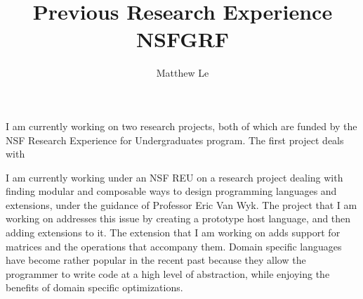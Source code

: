 \documentclass[a4paper,12pt]{article}
\title{Previous Research Experience NSFGRF \vspace{-1ex}}
\author{Matthew Le\vspace{-5ex}}
\begin{document}
\maketitle

I am currently working on two research projects, both of which are funded by the NSF Research Experience for Undergraduates program.  The first project deals with 

I am currently working under an NSF REU on a research project dealing with finding modular and composable ways to design programming languages and extensions, under the guidance of Professor Eric Van Wyk.  The project that I am working on addresses this issue by creating a prototype host language, and then adding extensions to it.  The extension that I am working on adds support for matrices and the operations that accompany them.  Domain specific languages have become rather popular in the recent past because they allow the programmer to write code at a high level of abstraction, while enjoying the benefits of domain specific optimizations. 
\end{document}
